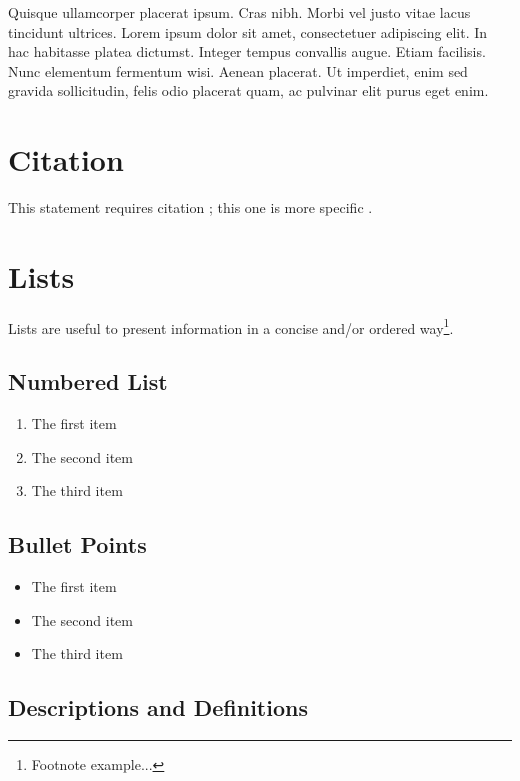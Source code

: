 \documentclass[11pt,fleqn]{book} %
\begin{document}
Quisque ullamcorper placerat ipsum. Cras nibh. Morbi vel justo vitae lacus tincidunt ultrices. Lorem ipsum dolor sit amet, consectetuer adipiscing elit. In hac habitasse platea dictumst. Integer tempus convallis augue. Etiam facilisis. Nunc elementum fermentum wisi. Aenean placerat. Ut imperdiet, enim sed gravida sollicitudin, felis odio placerat quam, ac pulvinar elit purus eget enim.


\section{Citation}

This statement requires citation \cite{book_key}; this one is more specific \cite[122]{article_key}.


\section{Lists}

Lists are useful to present information in a concise and/or ordered way\footnote{Footnote example...}.

\subsection{Numbered List}

\begin{enumerate}
\item The first item
\item The second item
\item The third item
\end{enumerate}

\subsection{Bullet Points}

\begin{itemize}
\item The first item
\item The second item
\item The third item
\end{itemize}

\subsection{Descriptions and Definitions}
\end{document}
